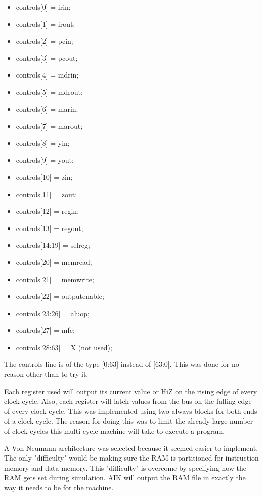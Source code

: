 \documentclass[conference]{IEEEtran}
\begin{document}
\begin{itemize}
\item controls[0] = irin;
\item controls[1] = irout;
\item controls[2] = pcin;
\item controls[3] = pcout;
\item controls[4] = mdrin;
\item controls[5] = mdrout;
\item controls[6] = marin;
\item controls[7] = marout;
\item controls[8] = yin;
\item controls[9] = yout;
\item controls[10] = zin;
\item controls[11] = zout;
\item controls[12] = regin;
\item controls[13] = regout;
\item controls[14:19] = selreg;
\item controls[20] = memread;
\item controls[21] = memwrite;
\item controls[22] = outputenable;
\item controls[23:26] = aluop;
\item controls[27] = mfc;
\item controls[28:63] = X (not used);
\end{itemize}
The controls line is of the type [0:63] instead of [63:0].
This was done for no reason other than to try it.

Each register used will output its current value or HiZ on the rising edge of every clock cycle.
Also, each register will latch values from the bus on the falling edge of every clock cycle.
This was implemented using two always blocks for both ends of a clock cycle. 
The reason for doing this was to limit the already large number of clock cycles this multi-cycle machine will take to execute a program.

A Von Neumann architecture was selected because it seemed easier to implement.
The only "difficulty" would be making sure the RAM is partitioned for instruction memory and data memory.
This "difficulty" is overcome by specifying how the RAM gets set during simulation.
AIK will output the RAM file in exactly the way it needs to be for the machine.
\end{document}
